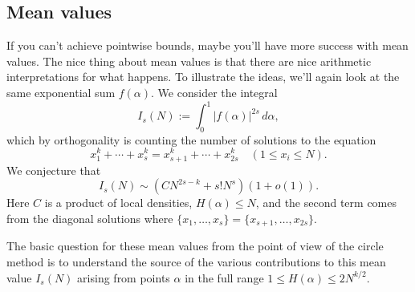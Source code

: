 \documentclass[reqno]{amsart} 
\numberwithin{theorem}{section}
\numberwithin{equation}{section}
\begin{document}
\subsection{Mean values}

If you can't achieve pointwise bounds, maybe you'll have more success with mean values.  The nice thing about mean values is that there are nice arithmetic interpretations for what happens.  To illustrate the ideas, we'll again look at the same exponential sum $f(\alpha)$.  We consider the integral
\begin{equation*}
  I_s(N) :=
  \int_0^1 \left\lvert f(\alpha) \right\rvert^{2 s} \, d \alpha,
\end{equation*}
which by orthogonality is counting the number of solutions to the equation
\begin{equation*}
  x_1^k + \dotsb + x_s^k = x_{s + 1}^k + \dotsb + x_{2 s}^k \quad(1 \leq x_i \leq  N).
\end{equation*}
We conjecture that
\begin{equation*}
  I_s(N) \sim \left( C N^{2 s - k} + s ! N^s \right)(1 + o(1)).
\end{equation*}
Here $C$ is a product of local densities, $H(\alpha) \leq N$, and the second term comes from the diagonal solutions where $\{x_1, \dotsc, x_s\} = \{x_{s + 1}, \dotsc, x_{2 s}\}$.

The basic question for these mean values from the point of view of the circle method is to understand the source of the various contributions to this mean value $I_s(N)$ arising from points $\alpha$ in the full range $1 \leq H(\alpha) \leq 2 N^{k/2}$.
\end{document}
